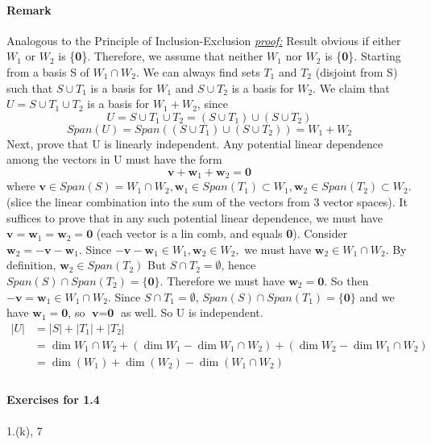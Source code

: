 \documentclass[11pt]{article}
\newcommand{\tb}[1]{\textbf{#1}}
\newcommand{\proof}[0]{\textit{\underline{proof:} }}
\begin{document}
	\paragraph{Remark} Analogous to the Principle of Inclusion-Exclusion \newline \newline
	\proof Result obvious if either $W_1$ or $W_2$ is \{\tb{0}\}. \newline
	Therefore, we assume that neither $W_1$ nor $W_2$ is  \{\tb{0}\}. Starting from a basis S of $W_1 \cap W_2$. We can always find sets $T_1$ and $T_2$ (disjoint from S) such that $S \cup T_1$ is a basis for $W_1$ and $S \cup T_2$ is a basis for $W_2$. We claim that $U = S \cup T_1 \cup T_2$ is a basis for $W_1 + W_2$, since 
	$$ U = S \cup T_1 \cup T_2 = (S \cup T_1) \cup (S\cup T_2)$$
	$$Span(U) = Span((S \cup T_1) \cup (S\cup T_2)) = W_1 + W_2$$
	Next, prove that U is linearly independent. Any potential linear dependence among the vectors in U must have the form 
	$$\tb{v} + \tb{w}_1 + \tb{w}_2 = \tb{0}$$
	where $\tb{v} \in Span(S) = W_1 \cap W_2, \tb{w}_1 \in Span(T_1) \subset W_1, \tb{w}_2 \in Span(T_2) \subset W_2$. (slice the linear combination into the sum of the vectors from 3 vector spaces). It suffices to prove that in any such potential linear dependence, we must have $\tb{v} = \tb{w}_1 = \tb{w}_2 = \tb{0}$ (each vector is a lin comb, and equals \tb{0}).  \newline
	Consider $\tb{w}_2 = -\tb{v} - \tb{w}_1$. Since $-\tb{v} - \tb{w}_1 \in W_1, \tb{w}_2 \in W_2,$ we must have $\tb{w}_2 \in W_1 \cap W_2$. By definition, $\tb{w}_2 \in Span(T_2)$ But $S \cap T_2 = \emptyset$, hence $Span(S) \cap Span(T_2) = \{\tb{0}\}.$ Therefore we must have $\tb{w}_2 = \tb{0}$. So then $-\tb{v} = \tb{w}_1 \in W_1 \cap W_2$. Since $S \cap T_1 = \emptyset$, $Span(S) \cap Span(T_1) = \{\tb{0}\}$ and we have $\tb{w}_1 = \tb{0}$, so $\tb{v} = \tb{0}$ as well. So U is independent. \newline
	\begin{align*}
		|U| &= |S| + |T_1| + |T_2|\\
		&=\dim{W_1\cap W_2} + (\dim{W_1}-\dim{W_1\cap W_2}) + (\dim{W_2} - \dim{W_1\cap W_2})\\
		&= \dim(W_1) + \dim(W_2) - \dim(W_1 \cap W_2)\\
	\end{align*}
	\paragraph{Exercises for 1.4}
	1.(k), 7
\end{document}
